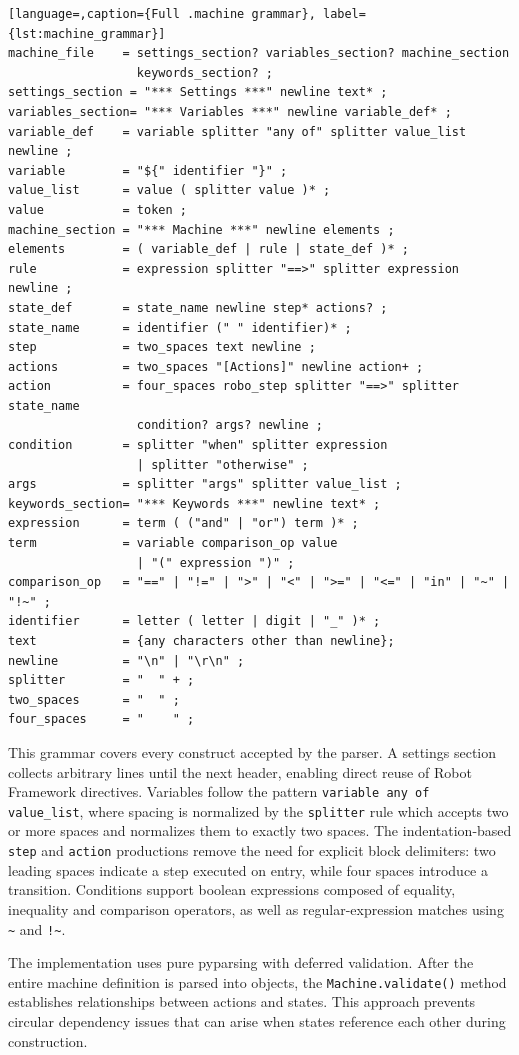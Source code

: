 \begin{lstlisting}[language=,caption={Full .machine grammar}, label={lst:machine_grammar}]
machine_file    = settings_section? variables_section? machine_section
                  keywords_section? ;
settings_section = "*** Settings ***" newline text* ;
variables_section= "*** Variables ***" newline variable_def* ;
variable_def    = variable splitter "any of" splitter value_list newline ;
variable        = "${" identifier "}" ;
value_list      = value ( splitter value )* ;
value           = token ;
machine_section = "*** Machine ***" newline elements ;
elements        = ( variable_def | rule | state_def )* ;
rule            = expression splitter "==>" splitter expression newline ;
state_def       = state_name newline step* actions? ;
state_name      = identifier (" " identifier)* ;
step            = two_spaces text newline ;
actions         = two_spaces "[Actions]" newline action+ ;
action          = four_spaces robo_step splitter "==>" splitter state_name
                  condition? args? newline ;
condition       = splitter "when" splitter expression
                  | splitter "otherwise" ;
args            = splitter "args" splitter value_list ;
keywords_section= "*** Keywords ***" newline text* ;
expression      = term ( ("and" | "or") term )* ;
term            = variable comparison_op value
                  | "(" expression ")" ;
comparison_op   = "==" | "!=" | ">" | "<" | ">=" | "<=" | "in" | "~" | "!~" ;
identifier      = letter ( letter | digit | "_" )* ;
text            = {any characters other than newline};
newline         = "\n" | "\r\n" ;
splitter        = "  " + ;
two_spaces      = "  " ;
four_spaces     = "    " ;
\end{lstlisting}
This grammar covers every construct accepted by the parser. A settings section
collects arbitrary lines until the next header, enabling direct reuse of Robot
Framework directives. Variables follow the pattern \texttt{variable any of value\_list},
where spacing is normalized by the \texttt{splitter} rule which accepts two or
more spaces and normalizes them to exactly two spaces. The indentation-based
\texttt{step} and \texttt{action} productions remove the need for explicit block
delimiters: two leading spaces indicate a step executed on entry, while four
spaces introduce a transition. Conditions support boolean expressions composed
of equality, inequality and comparison operators, as well as regular-expression
matches using \texttt{\textasciitilde} and \texttt{!\textasciitilde}.

The implementation uses pure pyparsing with deferred validation. After the entire
machine definition is parsed into objects, the \texttt{Machine.validate()} method
establishes relationships between actions and states. This approach prevents
circular dependency issues that can arise when states reference each other during
construction.

